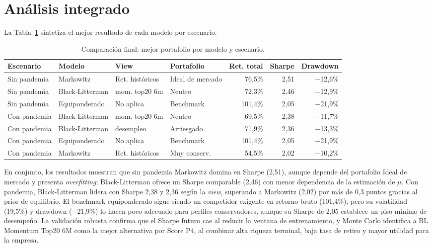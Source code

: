 \section{An\'alisis integrado}

La Tabla~\ref{tab:comparacion_final} sintetiza el mejor resultado de cada modelo por escenario.

\begin{table}[h]
\centering
\caption{Comparaci\'on final: mejor portafolio por modelo y escenario.}
\label{tab:comparacion_final}
\scriptsize
\begin{tabular}{@{}llllrrr@{}}
\toprule
Escenario & Modelo & View & Portafolio & Ret. total & Sharpe & Drawdown \\
\midrule
Sin pandemia & Markowitz & Ret. hist\'oricos & Ideal de mercado & 76,5\% &
2,51 & $-$12,6\% \\
Sin pandemia & Black-Litterman & mom. top20 6m & Neutro & 72,3\% & 2,46 &
$-$12,9\% \\
Sin pandemia & Equiponderado & No aplica & Benchmark & 101,4\% & 2,05 &
$-$21,9\% \\
\midrule
Con pandemia & Black-Litterman & mom. top20 6m & Neutro & 69,5\% & 2,38 &
$-$11,7\% \\
Con pandemia & Black-Litterman & desempleo & Arriesgado & 71,9\% & 2,36 &
$-$13,3\% \\
Con pandemia & Equiponderado & No aplica & Benchmark & 101,4\% & 2,05 &
$-$21,9\% \\
Con pandemia & Markowitz & Ret. hist\'oricos & Muy conserv. & 54,5\% & 2,02 &
$-$10,2\% \\
\bottomrule
\end{tabular}
\end{table}

En conjunto, los resultados muestran que sin pandemia Markowitz domina en Sharpe (2,51), aunque depende del portafolio Ideal de mercado y presenta \textit{overfitting}; Black-Litterman ofrece un Sharpe comparable (2,46) con menor dependencia de la estimaci\'on de $\mu$. Con pandemia, Black-Litterman lidera con Sharpe 2,38 y 2,36 seg\'un la \textit{view}, superando a Markowitz (2,02) por m\'as de 0,3 puntos gracias al prior de equilibrio. El benchmark equiponderado sigue siendo un competidor exigente en retorno bruto (101,4\%), pero su volatilidad (19,5\%) y drawdown ($-$21,9\%) lo hacen poco adecuado para perfiles conservadores, aunque su Sharpe de 2,05 establece un piso m\'inimo de desempe\~no. La validaci\'on robusta confirma que el Sharpe futuro cae al reducir la ventana de entrenamiento, y Monte Carlo identifica a BL Momentum Top20 6M como la mejor alternativa por Score P4, al combinar alta riqueza terminal, baja tasa de retiro y mayor utilidad para la empresa.


